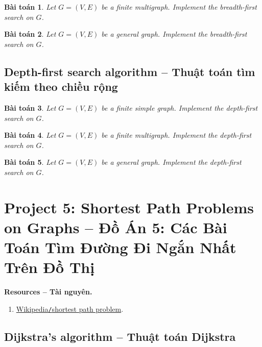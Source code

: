 \documentclass{article}
\newtheorem{baitoan}{Bài toán}
\begin{document}
\begin{baitoan}
    Let $G = (V,E)$ be a finite multigraph. Implement the breadth-first search on $G$.
\end{baitoan}

\begin{baitoan}
    Let $G = (V,E)$ be a general graph. Implement the breadth-first search on $G$.
\end{baitoan}


\subsection{Depth-first search algorithm -- Thuật toán tìm kiếm theo chiều rộng}

\begin{baitoan}
    Let $G = (V,E)$ be a finite simple graph. Implement the depth-first search on $G$.
\end{baitoan}

\begin{baitoan}
    Let $G = (V,E)$ be a finite multigraph. Implement the depth-first search on $G$.
\end{baitoan}

\begin{baitoan}
    Let $G = (V,E)$ be a general graph. Implement the depth-first search on $G$.
\end{baitoan}


\section{Project 5: Shortest Path Problems on Graphs -- Đồ Án 5: Các Bài Toán Tìm Đường Đi Ngắn Nhất Trên Đồ Thị}
\textbf{\textsf{Resources -- Tài nguyên.}}
\begin{enumerate}
    \item \href{https://en.wikipedia.org/wiki/Shortest_path_problem}{Wikipedia{\tt/}shortest path problem}.
\end{enumerate}


\subsection{Dijkstra's algorithm -- Thuật toán Dijkstra}
\end{document}

